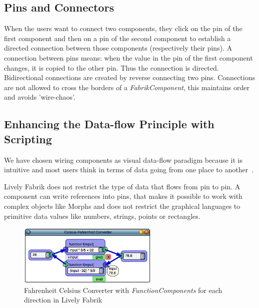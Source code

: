 \documentclass[pdftex, times, 10pt, twocolumn]{article}
\begin{document}
\subsection{Pins and Connectors}
When the users want to connect two components, they click on the pin of the first component and then on a pin of the second component to establish a directed connection between those components (respectively their pins). A connection between pins means: when the value in the pin of the first component changes, it is copied to the other pin. Thus the connection is directed. Bidirectional connections are created by reverse connecting two pins. Connections are not allowed to cross the borders of a {\em FabrikComponent}, this maintains order and avoids 'wire-chaos'. 



\subsection{Enhancing the Data-flow Principle with Scripting}
We have chosen wiring components as visual data-flow paradigm because it is intuitive and most users think in terms of data going from one place to another~\cite{Baroth1995VPR,Johnston2004ADP}. 

Lively Fabrik does not restrict the type of data that flows from pin to pin. A component can write references into pins, that makes it possible to work with complex objects like Morphs and does not restrict the graphical languages to primitive data values like numbers, strings, points or rectangles.  



\begin{figure}[]\centering
\includegraphics[width=0.600000\textwidth]{FabrikCelsiusFahrenheit.png} 

\caption{Fahrenheit Celsius Converter with {\em FunctionComponents} for each direction in Lively Fabrik }
\label{fig:FabrikCelsiusFahrenheit}
\end{figure}
\end{document}
